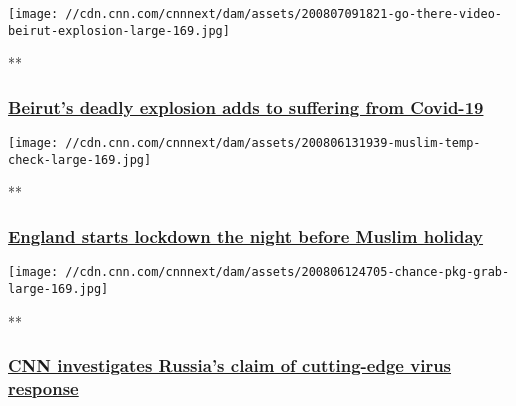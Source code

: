 \href{/videos/world/2020/08/07/beirut-explosion-amplifies-coronavirus-economic-struggles-go-there.cnn/video/playlists/coronavirus-intl/}{}

\texttt{[image: //cdn.cnn.com/cnnnext/dam/assets/200807091821-go-there-video-beirut-explosion-large-169.jpg]}

**

\hypertarget{beiruts-deadly-explosion-adds-to-suffering-from-covid-19}{%
\subsubsection{\texorpdfstring{\href{/videos/world/2020/08/07/beirut-explosion-amplifies-coronavirus-economic-struggles-go-there.cnn/video/playlists/coronavirus-intl/}{Beirut's
deadly explosion adds to suffering from
Covid-19}}{Beirut's deadly explosion adds to suffering from Covid-19}}\label{beiruts-deadly-explosion-adds-to-suffering-from-covid-19}}

\href{/videos/world/2020/08/06/england-lockdown-on-eid-eve-muslims-veselinovic-vpx.cnn/video/playlists/coronavirus-intl/}{}

\texttt{[image: //cdn.cnn.com/cnnnext/dam/assets/200806131939-muslim-temp-check-large-169.jpg]}

**

\hypertarget{england-starts-lockdown-the-night-before-muslim-holiday}{%
\subsubsection{\texorpdfstring{\href{/videos/world/2020/08/06/england-lockdown-on-eid-eve-muslims-veselinovic-vpx.cnn/video/playlists/coronavirus-intl/}{England
starts lockdown the night before Muslim
holiday}}{England starts lockdown the night before Muslim holiday}}\label{england-starts-lockdown-the-night-before-muslim-holiday}}

\href{/videos/world/2020/08/06/russia-vaccine-testing-matthew-chance-pkg-newday-intl-ldn-vpx.cnn/video/playlists/coronavirus-intl/}{}

\texttt{[image: //cdn.cnn.com/cnnnext/dam/assets/200806124705-chance-pkg-grab-large-169.jpg]}

**

\hypertarget{cnn-investigates-russias-claim-of-cutting-edge-virus-response}{%
\subsubsection{\texorpdfstring{\href{/videos/world/2020/08/06/russia-vaccine-testing-matthew-chance-pkg-newday-intl-ldn-vpx.cnn/video/playlists/coronavirus-intl/}{CNN
investigates Russia's claim of cutting-edge virus
response}}{CNN investigates Russia's claim of cutting-edge virus response}}\label{cnn-investigates-russias-claim-of-cutting-edge-virus-response}}

